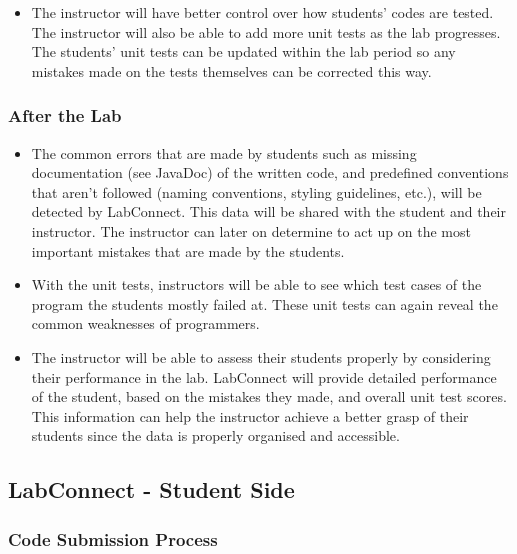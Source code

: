 \documentclass[a4paper, 12pt]{article}
\begin{document}
    \begin{itemize}
        \item The instructor will have better control over how students' codes are tested.
        The instructor will also be able to add more unit tests as the lab progresses.
        The students' unit tests can be updated within the lab period so any mistakes made
        on the tests themselves can be corrected this way.
    \end{itemize}

    \subsubsection{After the Lab}

    \begin{itemize}
        \item The common errors that are made by students such as missing documentation (see JavaDoc)
        of the written code, and predefined conventions that aren't followed (naming conventions, styling
        guidelines, etc.), will be detected by LabConnect. This data will be shared with the student
        and their instructor. The instructor can later on determine to act up on the most
        important mistakes that are made by the students.
        \item With the unit tests, instructors will be able to see which test cases of the program
        the students mostly failed at. These unit tests can again reveal the common weaknesses
        of programmers.
        \item The instructor will be able to assess their students properly by considering their
        performance in the lab. LabConnect will provide detailed performance of the student,
        based on the mistakes they made, and overall unit test scores. This information can help
        the instructor achieve a better grasp of their students since the data is properly organised
        and accessible.
    \end{itemize}

    \subsection{LabConnect - Student Side}

    \subsubsection{Code Submission Process}
\end{document}
